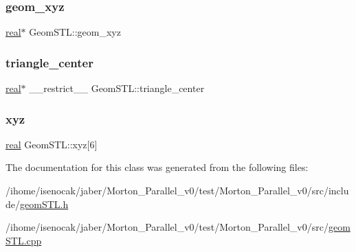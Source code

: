 \subsubsection{\texorpdfstring{geom\+\_\+xyz}{geom\_xyz}}
{\footnotesize\ttfamily \mbox{\hyperlink{definitions_8h_aedc0ad84d1e764530814f57ad931d02a}{real}}$\ast$ Geom\+S\+T\+L\+::geom\+\_\+xyz\hspace{0.3cm}{\ttfamily [private]}}

\mbox{\label{classGeomSTL_a090ec3d4d4a5be7eb0a0874ce91b07a3}} 
\subsubsection{\texorpdfstring{triangle\+\_\+center}{triangle\_center}}
{\footnotesize\ttfamily \mbox{\hyperlink{definitions_8h_aedc0ad84d1e764530814f57ad931d02a}{real}}$\ast$ \+\_\+\+\_\+restrict\+\_\+\+\_\+ Geom\+S\+T\+L\+::triangle\+\_\+center\hspace{0.3cm}{\ttfamily [private]}}

\mbox{\label{classGeomSTL_a38716d8c3db44ebc059e020d2ce926b2}} 
\subsubsection{\texorpdfstring{xyz}{xyz}}
{\footnotesize\ttfamily \mbox{\hyperlink{definitions_8h_aedc0ad84d1e764530814f57ad931d02a}{real}} Geom\+S\+T\+L\+::xyz\mbox{[}6\mbox{]}\hspace{0.3cm}{\ttfamily [private]}}



The documentation for this class was generated from the following files\+:\begin{DoxyCompactItemize}
\item 
/ihome/isenocak/jaber/\+Morton\+\_\+\+Parallel\+\_\+v0/test/\+Morton\+\_\+\+Parallel\+\_\+v0/src/include/\mbox{\hyperlink{geomSTL_8h}{geom\+S\+T\+L.\+h}}\item 
/ihome/isenocak/jaber/\+Morton\+\_\+\+Parallel\+\_\+v0/test/\+Morton\+\_\+\+Parallel\+\_\+v0/src/\mbox{\hyperlink{geomSTL_8cpp}{geom\+S\+T\+L.\+cpp}}\end{DoxyCompactItemize}
